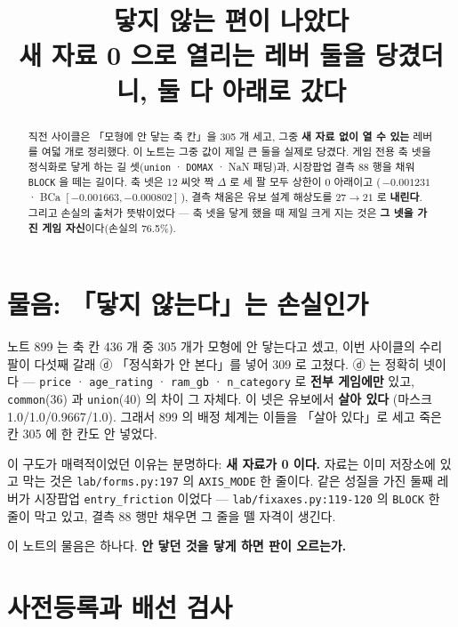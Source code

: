 \documentclass{article}
\title{닿지 않는 편이 나았다 \\
  {\large 새 자료 0 으로 열리는 레버 둘을 당겼더니, 둘 다 아래로 갔다}}
\begin{document}
\maketitle

\begin{abstract}
직전 사이클은 「모형에 안 닿는 축 칸」을 305 개 세고, 그중 \textbf{새 자료 없이 열 수 있는} 레버를
여덟 개로 정리했다. 이 노트는 그중 값이 제일 큰 둘을 실제로 당겼다.
게임 전용 축 넷을 정식화로 닿게 하는 길 셋(\texttt{union} · \texttt{DOMAX} · NaN 패딩)과,
시장팝업 결측 88 행을 채워 \texttt{BLOCK} 을 떼는 길이다.
 축 넷은 12 씨앗 짝 $\Delta$ 로 세 팔 모두 상한이 0 아래이고
(\,$-0.001231$ · BCa $[-0.001663,-0.000802]$\,), 결측 채움은 유보 설계 해상도를
$27 \rightarrow 21$ 로 \textbf{내린다}. 그리고 손실의 출처가 뜻밖이었다 —
축 넷을 닿게 했을 때 제일 크게 지는 것은 \textbf{그 넷을 가진 게임 자신}이다(손실의 76.5\%).
\end{abstract}

\section{물음: 「닿지 않는다」는 손실인가}

노트 899 는 축 칸 436 개 중 305 개가 모형에 안 닿는다고 셌고, 이번 사이클의 수리 팔이
다섯째 갈래 ⓓ 「정식화가 안 본다」를 넣어 309 로 고쳤다. ⓓ 는 정확히 넷이다 —
\texttt{price} · \texttt{age\_rating} · \texttt{ram\_gb} · \texttt{n\_category} 로 \textbf{전부 게임에만} 있고,
\texttt{common}(36) 과 \texttt{union}(40) 의 차이 그 자체다. 이 넷은 유보에서 \textbf{살아 있다}
(마스크 1.0/1.0/0.9667/1.0). 그래서 899 의 배정 체계는 이들을 「살아 있다」로 세고
죽은 칸 305 에 한 칸도 안 넣었다.

이 구도가 매력적이었던 이유는 분명하다: \textbf{새 자료가 0 이다.} 자료는 이미 저장소에 있고
막는 것은 \texttt{lab/forms.py:197} 의 \texttt{AXIS\_MODE} 한 줄이다.
같은 성질을 가진 둘째 레버가 시장팝업 \texttt{entry\_friction} 이었다 —
\texttt{lab/fixaxes.py:119-120} 의 \texttt{BLOCK} 한 줄이 막고 있고, 결측 88 행만 채우면
그 줄을 뗄 자격이 생긴다.

이 노트의 물음은 하나다. \textbf{안 닿던 것을 닿게 하면 판이 오르는가.}

\section{사전등록과 배선 검사}
\end{document}
